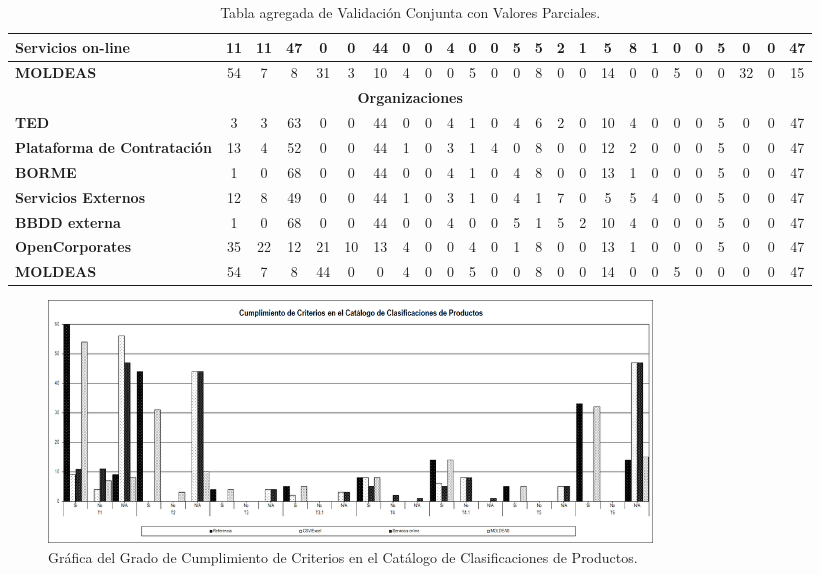 \begin{table}
\begin{center}
\begin{tabular}{|p{3cm}||c|c|c||c|c|c||c|c|c||c|c|c||c|c|c||c|c|c||c|c|c||c|c|c|}
 \textbf{Servicios on-line} & 11 & 11 & 47 & 0 & 0 & 44 & 0 & 0 & 4 & 0 & 0 & 5 & 5 & 2 & 1 & 5 & 8 & 1 & 0 & 0 & 5 & 0 & 0 & 47 \\ \hline 
 \textbf{\gls{MOLDEAS}}& 54 & 7 & 8 & 31 & 3 & 10 & 4 & 0 & 0 & 5 & 0 & 0 & 8 & 0 & 0 & 14 & 0 & 0 & 5 & 0 & 0 & 32 & 0 & 15 \\ \hline 
 \multicolumn{25}{|c|}{\textbf{Organizaciones}} \\ \hline
 \textbf{TED} 			&  3 & 3 & 63 & 0 & 0 & 44 & 0 & 0 & 4 & 1 & 0 & 4 & 6 & 2 & 0 & 10 & 4 & 0 & 0 & 0 & 5 & 0 & 0 & 47 \\ \hline 
 \textbf{Plataforma de Contratación} &    13 & 4 & 52 & 0 & 0 & 44 & 1 & 0 & 3 & 1 & 4 & 0 & 8 & 0 & 0 & 12 & 2 & 0 & 0 & 0 & 5 & 0 & 0 & 47 \\ \hline 
 \textbf{\gls{BORME}}			 &    1 & 0 & 68 & 0 & 0 & 44 & 0 & 0 & 4 & 1 & 0 & 4 & 8 & 0 & 0 & 13 & 1 & 0 & 0 & 0 & 5 & 0 & 0 & 47 \\ \hline 
 \textbf{Servicios Externos} 	&  12 & 8 & 49 & 0 & 0 & 44 & 1 & 0 & 3 & 1 & 0 & 4 & 1 & 7 & 0 & 5 & 5 & 4 & 0 & 0 & 5 & 0 & 0 & 47 \\ \hline 
 \textbf{\gls{BBDD} externa} 		&     1 & 0 & 68 & 0 & 0 & 44 & 0 & 0 & 4 & 0 & 0 & 5 & 1 & 5 & 2 & 10 & 4 & 0 & 0 & 0 & 5 & 0 & 0 & 47 \\ \hline 
 \textbf{OpenCorporates} 	&    35 & 22 & 12 & 21 & 10 & 13 & 4 & 0 & 0 & 4 & 0 & 1 & 8 & 0 & 0 & 13 & 1 & 0 & 0 & 0 & 5 & 0 & 0 & 47 \\ \hline 
 \textbf{MOLDEAS} 		&    54 & 7 & 8 & 44 & 0 & 0 & 4 & 0 & 0 & 5 & 0 & 0 & 8 & 0 & 0 & 14 & 0 & 0 & 5 & 0 & 0 & 0 & 0 & 47 \\ \hline 
\hline
  \end{tabular}
  \caption{Tabla agregada de Validación Conjunta con Valores Parciales.}
  \label{tabla:agregado-full}
  \end{center}
\end{table} 


\begin{figure}[!htb]
\centering
	\includegraphics[width=16cm]{./images/phd/experimentation/criterios-pscs}
\caption{Gráfica del Grado de Cumplimiento de Criterios en el Catálogo de Clasificaciones de Productos.}
\label{fig:eval-criteria-pscs}
\end{figure}


